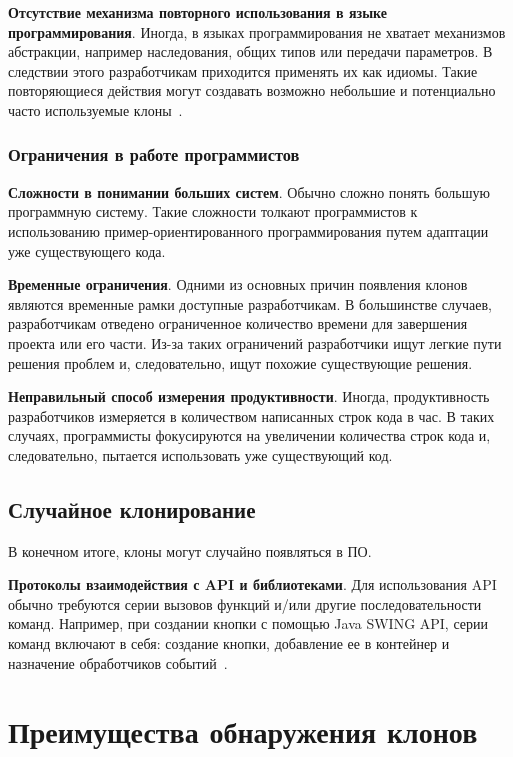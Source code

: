 \textbf{Отсутствие механизма повторного использования в языке программирования}. Иногда, в языках программирования не хватает механизмов абстракции, например наследования, общих типов или передачи параметров. В следствии этого разработчикам приходится применять их как идиомы. Такие повторяющиеся действия могут создавать возможно небольшие и потенциально часто используемые клоны~\cite{templates, javasys}.

\subsubsection{Ограничения в работе программистов}

\textbf{Сложности в понимании больших систем}. Обычно сложно понять большую программную систему. Такие сложности толкают программистов к использованию пример-ориентированного программирования путем адаптации уже существующего кода.

\textbf{Временные ограничения}. Одними из основных причин появления клонов являются временные рамки доступные разработчикам. В большинстве случаев, разработчикам отведено ограниченное количество времени для завершения проекта или его части. Из-за таких ограничений разработчики ищут легкие пути решения проблем и, следовательно, ищут похожие существующие решения. 

\textbf{Неправильный способ измерения продуктивности}. Иногда, продуктивность разработчиков измеряется в количеством написанных строк кода в час. В таких случаях, программисты фокусируются на увеличении количества строк кода и, следовательно, пытается использовать уже существующий код.

\subsection{Случайное клонирование}

В конечном итоге, клоны могут случайно появляться в ПО.

\textbf{Протоколы взаимодействия с API и библиотеками}. Для использования API обычно требуются серии вызовов функций и/или другие последовательности команд. Например, при создании кнопки с помощью Java SWING API, серии команд включают в себя: создание кнопки, добавление ее в контейнер и назначение обработчиков событий~\cite{fingerprints}.

\section{Преимущества обнаружения клонов}

